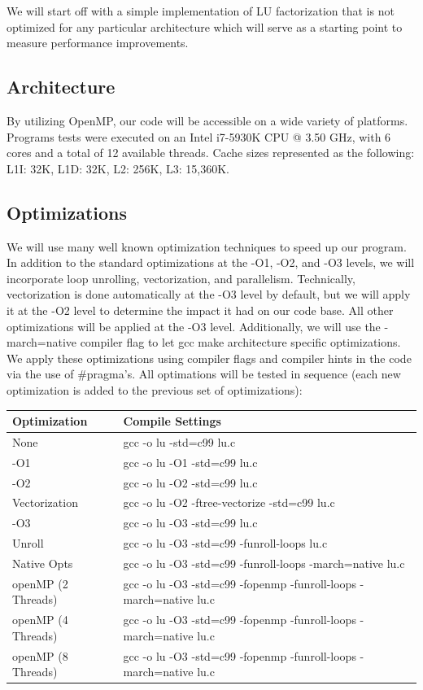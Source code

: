 \documentclass[12]{article}
\begin{document}
We will start off with a simple implementation of LU factorization that is not optimized for any particular architecture which will serve as a starting point to measure performance improvements.


\subsection{Architecture}

By utilizing OpenMP, our code will be accessible on a wide variety of platforms. Programs tests were executed on an Intel i7-5930K CPU @ 3.50 GHz, with 6 cores and a total of 12 available threads. Cache sizes represented as the following: L1I: 32K, L1D: 32K, L2: 256K, L3: 15,360K. 

\subsection{Optimizations}

We will use many well known optimization techniques to speed up our program.  In addition to the standard optimizations at the -O1, -O2, and -O3 levels, we will incorporate loop unrolling, vectorization, and parallelism.  Technically, vectorization is done automatically at the -O3 level by default, but we will apply it at the -O2 level to determine the impact it had on our code base.  All other optimizations will be applied at the -O3 level.  Additionally, we will use the -march=native compiler flag to let gcc make architecture specific optimizations.  We apply these optimizations using compiler flags and compiler hints in the code via the use of \#pragma's.  All optimations will be tested in sequence (each new optimization is added to the previous set of optimizations):

\begin{center}
\begin{tabular}{|l|l|}
\hline
Optimization & Compile Settings \\
\hline
None & gcc -o lu -std=c99 lu.c \\
-O1 & gcc -o lu -O1  -std=c99 lu.c	 \\
-O2 & gcc -o lu -O2 -std=c99 lu.c \\
Vectorization & gcc -o lu -O2 -ftree-vectorize -std=c99 lu.c \\
-O3 & gcc -o lu -O3 -std=c99 lu.c	 \\
Unroll & gcc -o lu -O3 -std=c99 -funroll-loops lu.c \\
Native Opts & gcc -o lu -O3 -std=c99 -funroll-loops -march=native lu.c \\
openMP (2 Threads) & gcc -o lu -O3 -std=c99 -fopenmp -funroll-loops -march=native lu.c \\
openMP (4 Threads) & gcc -o lu -O3 -std=c99 -fopenmp -funroll-loops -march=native lu.c \\
openMP (8 Threads) & gcc -o lu -O3 -std=c99 -fopenmp -funroll-loops -march=native lu.c \\
\hline
\end{tabular}
\end{center}
\end{document}
